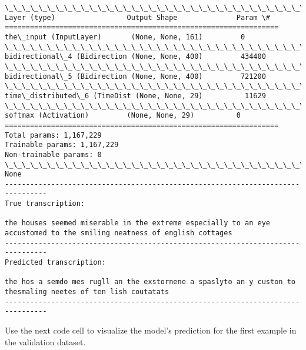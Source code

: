 \documentclass[11pt]{article}
\begin{document}
    \begin{Verbatim}[commandchars=\\\{\}]
\_\_\_\_\_\_\_\_\_\_\_\_\_\_\_\_\_\_\_\_\_\_\_\_\_\_\_\_\_\_\_\_\_\_\_\_\_\_\_\_\_\_\_\_\_\_\_\_\_\_\_\_\_\_\_\_\_\_\_\_\_\_\_\_\_
Layer (type)                 Output Shape              Param \#   
=================================================================
the\_input (InputLayer)       (None, None, 161)         0         
\_\_\_\_\_\_\_\_\_\_\_\_\_\_\_\_\_\_\_\_\_\_\_\_\_\_\_\_\_\_\_\_\_\_\_\_\_\_\_\_\_\_\_\_\_\_\_\_\_\_\_\_\_\_\_\_\_\_\_\_\_\_\_\_\_
bidirectional\_4 (Bidirection (None, None, 400)         434400    
\_\_\_\_\_\_\_\_\_\_\_\_\_\_\_\_\_\_\_\_\_\_\_\_\_\_\_\_\_\_\_\_\_\_\_\_\_\_\_\_\_\_\_\_\_\_\_\_\_\_\_\_\_\_\_\_\_\_\_\_\_\_\_\_\_
bidirectional\_5 (Bidirection (None, None, 400)         721200    
\_\_\_\_\_\_\_\_\_\_\_\_\_\_\_\_\_\_\_\_\_\_\_\_\_\_\_\_\_\_\_\_\_\_\_\_\_\_\_\_\_\_\_\_\_\_\_\_\_\_\_\_\_\_\_\_\_\_\_\_\_\_\_\_\_
time\_distributed\_6 (TimeDist (None, None, 29)          11629     
\_\_\_\_\_\_\_\_\_\_\_\_\_\_\_\_\_\_\_\_\_\_\_\_\_\_\_\_\_\_\_\_\_\_\_\_\_\_\_\_\_\_\_\_\_\_\_\_\_\_\_\_\_\_\_\_\_\_\_\_\_\_\_\_\_
softmax (Activation)         (None, None, 29)          0         
=================================================================
Total params: 1,167,229
Trainable params: 1,167,229
Non-trainable params: 0
\_\_\_\_\_\_\_\_\_\_\_\_\_\_\_\_\_\_\_\_\_\_\_\_\_\_\_\_\_\_\_\_\_\_\_\_\_\_\_\_\_\_\_\_\_\_\_\_\_\_\_\_\_\_\_\_\_\_\_\_\_\_\_\_\_
None
--------------------------------------------------------------------------------
True transcription:

the houses seemed miserable in the extreme especially to an eye accustomed to the smiling neatness of english cottages
--------------------------------------------------------------------------------
Predicted transcription:

the hos a semdo mes rugll an the exstornene a spaslyto an y custon to thesmaling neetes of ten lish coutatats
--------------------------------------------------------------------------------

    \end{Verbatim}

    Use the next code cell to visualize the model's prediction for the first
example in the validation dataset.
\end{document}
